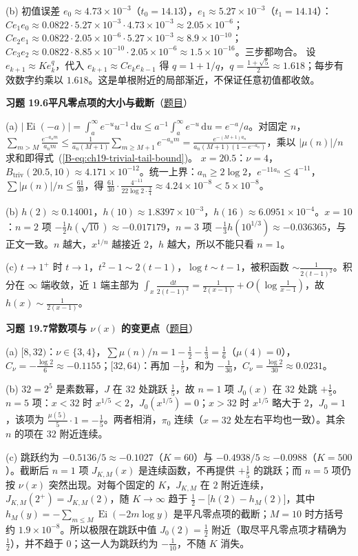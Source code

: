 \documentclass[11pt,a4paper]{article}
\DeclareMathOperator{\Ei}{Ei}
\newcommand{\dd}{\,\mathrm{d}}
\newcommand{\bref}[1]{\ref*{B-#1}}
\newcommand{\Sol}[2]{%
  \par\addvspace{1.2em}\noindent
  \hypertarget{s:#1}{}\textbf{习题 #1\quad #2}\hfill{\small（\hyperlink{q:#1}{题目}）}\par
  \nopagebreak\smallskip}
\begin{document}
(b) 初值误差 $e_0\approx4.73\times10^{-3}$（$t_0=14.13$），$e_1\approx5.27\times10^{-3}$（$t_1=14.14$）：
$Ce_1e_0\approx0.0822\cdot5.27\times10^{-3}\cdot4.73\times10^{-3}\approx2.05\times10^{-6}$；
$Ce_2e_1\approx0.0822\cdot2.05\times10^{-6}\cdot5.27\times10^{-3}\approx8.9\times10^{-10}$；
$Ce_3e_2\approx0.0822\cdot8.85\times10^{-10}\cdot2.05\times10^{-6}\approx1.5\times10^{-16}$。三步都吻合。
设 $e_{k+1}\approx Ke_k^q$，代入 $e_{k+1}\approx Ce_ke_{k-1}$ 得 $q=1+1/q$，$q=\frac{1+\sqrt5}2\approx1.618$；每步有效数字约乘以 $1.618$。这是单根附近的局部渐近，不保证任意初值都收敛。

\Sol{19.6}{平凡零点项的大小与截断}
(a) $|\Ei(-a)|=\int_a^\infty e^{-u}u^{-1}\dd u\le a^{-1}\int_a^\infty e^{-u}\dd u=e^{-a}/a$。对固定 $n$，$\sum_{m>M}\frac{e^{-a_nm}}{a_nm}\le\frac{1}{a_n(M+1)}\sum_{m\ge M+1}e^{-a_nm}=\frac{e^{-(M+1)a_n}}{a_n(M+1)(1-e^{-a_n})}$，乘以 $|\mu(n)|/n$ 求和即得式~(\bref{eq:ch19-trivial-tail-bound})。
$x=20.5$：$\nu=4$，$B_{\mathrm{triv}}(20.5,10)\approx4.171\times10^{-12}$。统一上界：$a_n\ge2\log2$，$e^{-11a_n}\le4^{-11}$，$\sum|\mu(n)|/n\le\frac{61}{30}$，得 $\frac{61}{30}\cdot\frac{4^{-11}}{22\log2\cdot\frac34}\approx4.24\times10^{-8}<5\times10^{-8}$。

(b) $h(2)\approx0.14001$，$h(10)\approx1.8397\times10^{-3}$，$h(16)\approx6.0951\times10^{-4}$。$x=10$：$n=2$ 项 $-\frac12h(\sqrt{10})\approx-0.017179$，$n=3$ 项 $-\frac13h(10^{1/3})\approx-0.036365$，与正文一致。$n$ 越大，$x^{1/n}$ 越接近 $2$，$h$ 越大，所以不能只看 $n=1$。

(c) $t\to1^+$ 时 $t\to1$，$t^2-1\sim2(t-1)$，$\log t\sim t-1$，被积函数 $\sim\frac1{2(t-1)^2}$。积分在 $\infty$ 端收敛，近 $1$ 端主部为 $\int_x\frac{\dd t}{2(t-1)^2}=\frac1{2(x-1)}+O(\log\frac1{x-1})$，故 $h(x)\sim\frac1{2(x-1)}$。

\Sol{19.7}{常数项与 $\nu(x)$ 的变更点}
(a) $[8,32)$：$\nu\in\{3,4\}$，$\sum\mu(n)/n=1-\frac12-\frac13=\frac16$（$\mu(4)=0$），$C_\nu=-\frac{\log2}6\approx-0.1155$；$[32,64)$：再加 $-\frac15$，和为 $-\frac1{30}$，$C_\nu=\frac{\log2}{30}\approx0.0231$。

(b) $32=2^5$ 是素数幂，$J$ 在 $32$ 处跳跃 $\frac15$，故 $n=1$ 项 $J_0(x)$ 在 $32$ 处跳 $+\frac15$。$n=5$ 项：$x<32$ 时 $x^{1/5}<2$，$J_0(x^{1/5})=0$；$x>32$ 时 $x^{1/5}$ 略大于 $2$，$J_0=1$，该项为 $\frac{\mu(5)}5\cdot1=-\frac15$。两者相消，$\pi_0$ 连续（$x=32$ 处左右平均也一致）。其余 $n$ 的项在 $32$ 附近连续。

(c) 跳跃约为 $-0.5136/5\approx-0.1027$（$K=60$）与 $-0.4938/5\approx-0.0988$（$K=500$）。截断后 $n=1$ 项 $J_{K,M}(x)$ 是连续函数，不再提供 $+\frac15$ 的跳跃；而 $n=5$ 项仍按 $\nu(x)$ 突然出现。对每个固定的 $K$，$J_{K,M}$ 在 $2$ 附近连续，$J_{K,M}(2^+)=J_{K,M}(2)$，随 $K\to\infty$ 趋于 $\frac12-\bigl[h(2)-h_M(2)\bigr]$，其中 $h_M(y)=-\sum_{m\le M}\Ei(-2m\log y)$ 是平凡零点项的截断；$M=10$ 时方括号约 $1.9\times10^{-8}$。所以极限在跳跃中值 $J_0(2)=\frac12$ 附近（取尽平凡零点项才精确为 $\frac12$），并不趋于 $0$；这一人为跳跃约为 $-\frac1{10}$，不随 $K$ 消失。
\end{document}
